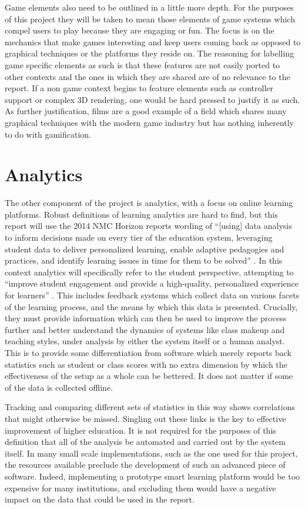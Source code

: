 \documentclass[12pt,a4paper,twoside]{report}
\begin{document}
Game elements also need to be outlined in a little more depth. For the purposes of this project they will be taken to mean those elements of game systems which compel users to play because they are engaging or fun. The focus is on the mechanics that make games interesting and keep users coming back as opposed to graphical techniques or the platforms they reside on. The reasoning for labelling game specific elements as such is that these features are not easily ported to other contexts and the ones in which they are shared are of no relevance to the report. If a non game context begins to feature elements such as controller support or complex 3D rendering, one would be hard pressed to justify it as such. As further justification, films are a good example of a field which shares many graphical techniques with the modern game industry but has nothing inherently to do with gamification.

\section{Analytics}
The other component of the project is analytics, with a focus on online learning platforms. Robust definitions of learning analytics are hard to find, but this report will use the 2014 NMC Horizon reports wording of ``[using] data analysis to inform decisions made on every tier of the education system, leveraging student data to deliver personalized learning, enable adaptive pedagogies and practices, and identify learning issues in time for them to be solved'' \cite{johnson2014nmc}. In this context analytics will specifically refer to the student perspective, attempting to ``improve student engagement and provide a high-quality, personalized experience for learners'' \cite{johnson2014nmc}. This includes feedback systems which collect data on various facets of the learning process, and the means by which this data is presented. Crucially, they must provide information which can then be used to improve the process further and better understand the dynamics of systems like class makeup and teaching styles, under analysis by either the system itself or a human analyst. This is to provide some differentiation from software which merely reports back statistics such as student or class scores with no extra dimension by which the effectiveness of the setup as a whole can be bettered. It does not matter if some of the data is collected offline.

Tracking and comparing different sets of statistics in this way shows correlations that might otherwise be missed. Singling out these links is the key to effective improvement of higher education. It is not required for the purposes of this definition that all of the analysis be automated and carried out by the system itself. In many small scale implementations, such as the one used for this project, the resources available preclude the development of such an advanced piece of software. Indeed, implementing a prototype smart learning platform would be too expensive for many institutions, and excluding them would have a negative impact on the data that could be used in the report.
\end{document}
